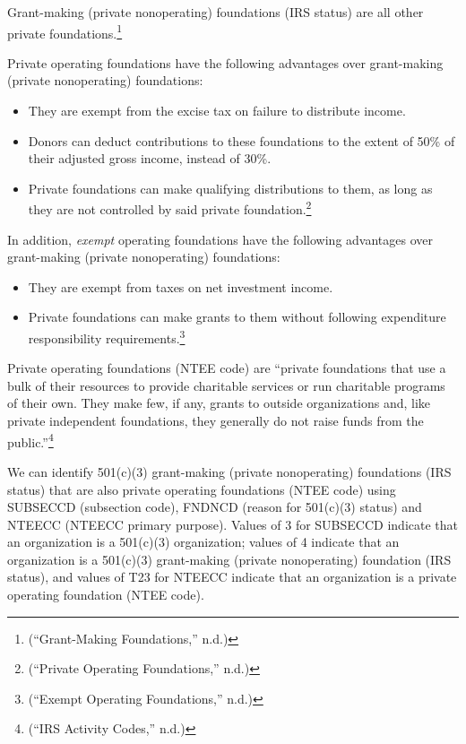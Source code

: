 \documentclass[
  letterpaper,
  DIV=11,
  numbers=noendperiod,
  oneside]{scrreprt}
\providecommand{\tightlist}{%
  \setlength{\itemsep}{0pt}\setlength{\parskip}{0pt}}\usepackage{longtable,booktabs,array}
\begin{document}
Grant-making (private nonoperating) foundations (IRS status) are all
other private foundations.\footnote{({``Grant-Making Foundations,''}
  n.d.)}

Private operating foundations have the following advantages over
grant-making (private nonoperating) foundations:

\begin{itemize}
\tightlist
\item
  They are exempt from the excise tax on failure to distribute income.
\item
  Donors can deduct contributions to these foundations to the extent of
  50\% of their adjusted gross income, instead of 30\%.
\item
  Private foundations can make qualifying distributions to them, as long
  as they are not controlled by said private foundation.\footnote{({``Private
    Operating Foundations,''} n.d.)}
\end{itemize}

In addition, \emph{exempt} operating foundations have the following
advantages over grant-making (private nonoperating) foundations:

\begin{itemize}
\tightlist
\item
  They are exempt from taxes on net investment income.
\item
  Private foundations can make grants to them without following
  expenditure responsibility requirements.\footnote{({``Exempt Operating
    Foundations,''} n.d.)}
\end{itemize}

Private operating foundations (NTEE code) are ``private foundations that
use a bulk of their resources to provide charitable services or run
charitable programs of their own. They make few, if any, grants to
outside organizations and, like private independent foundations, they
generally do not raise funds from the public.''\footnote{({``IRS
  Activity Codes,''} n.d.)}

We can identify 501(c)(3) grant-making (private nonoperating)
foundations (IRS status) that are also private operating foundations
(NTEE code) using SUBSECCD (subsection code), FNDNCD (reason for
501(c)(3) status) and NTEECC (NTEECC primary purpose). Values of 3 for
SUBSECCD indicate that an organization is a 501(c)(3) organization;
values of 4 indicate that an organization is a 501(c)(3) grant-making
(private nonoperating) foundation (IRS status), and values of T23 for
NTEECC indicate that an organization is a private operating foundation
(NTEE code).
\end{document}
